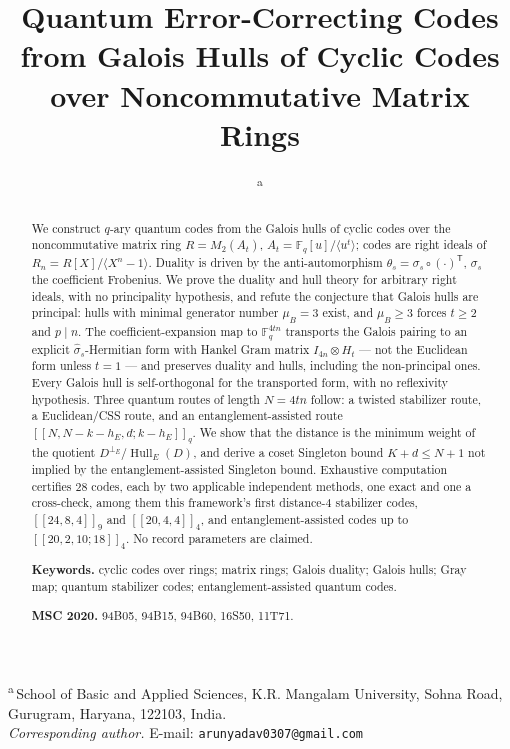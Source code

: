 \documentclass[11pt,a4paper]{article}
\title{Quantum Error-Correcting Codes from Galois Hulls of Cyclic
       Codes over Noncommutative Matrix Rings}
\author{\AUTHORONE\textsuperscript{a}}
\date{}
\makeatletter
\newcommand{\AUTHORONEINST}{School of Basic and Applied Sciences}
\newcommand{\AUTHORONEORG}{K.R. Mangalam University}
\newcommand{\AUTHORONEADDR}{Sohna Road, Gurugram, Haryana, 122103}
\newcommand{\AUTHORONECOUNTRY}{India}
\newcommand{\CORRESPONDINGEMAIL}{arunyadav0307@gmail.com}
\newcommand{\F}{\mathbb F}
\newcommand{\Hull}{\operatorname{Hull}}
\newcommand{\MU}{\mu}
\theoremstyle{plain}
\theoremstyle{definition}
\theoremstyle{remark}
\newcommand{\AFFILIATIONBLOCK}{%
  \begin{center}\small
  \textsuperscript{a}\,\AUTHORONEINST, \AUTHORONEORG,
  \AUTHORONEADDR, \AUTHORONECOUNTRY.\\[2pt]
  \textit{Corresponding author.} E-mail: \texttt{\CORRESPONDINGEMAIL}
  \end{center}}
\makeatother
\begin{document}
\maketitle
\AFFILIATIONBLOCK

\begin{abstract}
We construct $q$-ary quantum codes from the Galois hulls of cyclic codes over
the noncommutative matrix ring $R=M_2(A_t)$,
$A_t=\F_q[u]/\langle u^t\rangle$; codes are right ideals of
$R_n=R[X]/\langle X^n-1\rangle$.  Duality is driven by the anti-automorphism
$\theta_s=\sigma_s\circ(\cdot)^{\mathsf T}$, $\sigma_s$ the coefficient
Frobenius.  We prove the duality and hull theory for arbitrary right ideals,
with no principality hypothesis, and refute the conjecture that Galois hulls
are principal: hulls with minimal generator number $\MU_B=3$ exist, and
$\MU_B\ge3$ forces $t\ge2$ and $p\mid n$.  The coefficient-expansion map to
$\F_q^{4tn}$ transports the Galois pairing to an explicit
$\widehat\sigma_s$-Hermitian form with Hankel Gram matrix
$I_{4n}\otimes H_t$ --- not the Euclidean form unless $t=1$ --- and preserves
duality and hulls, including the non-principal ones.  Every Galois hull is
self-orthogonal for the transported form, with no reflexivity hypothesis.
Three quantum routes of length $N=4tn$ follow: a twisted stabilizer route, a
Euclidean/CSS route, and an entanglement-assisted route
$[[N,N-k-h_E,d;k-h_E]]_q$.  We show that the distance is the minimum weight of
the quotient $D^{\perp_E}/\Hull_E(D)$, and derive a coset Singleton bound
$K+d\le N+1$ not implied by the entanglement-assisted Singleton bound.
Exhaustive computation certifies $28$ codes, each by two applicable
independent methods, one exact and one a cross-check, among them this
framework's first distance-$4$ stabilizer codes, $[[24,8,4]]_9$ and
$[[20,4,4]]_4$, and entanglement-assisted codes up to $[[20,2,10;18]]_4$.  No record parameters are claimed.

\smallskip
\noindent\textbf{Keywords.} cyclic codes over rings; matrix rings; Galois
duality; Galois hulls; Gray map; quantum stabilizer codes;
entanglement-assisted quantum codes.

\smallskip
\noindent\textbf{MSC 2020.} 94B05, 94B15, 94B60, 16S50, 11T71.
\end{abstract}

\tableofcontents
\bigskip











\end{document}
